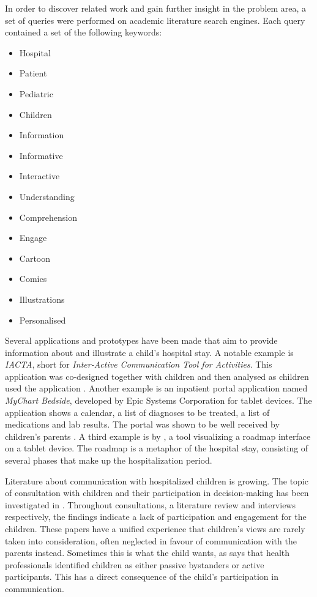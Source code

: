 In order to discover related work and gain further insight in the problem area, a set of queries were performed on academic literature search engines. Each query contained a set of the following keywords:

\begin{multicols}{3}
    \raggedcolumns
    \begin{itemize}
        \item Hospital
        \item Patient
        \item Pediatric
        \item Children
        \item Information
        \item Informative
        \item Interactive
        \item Understanding
        \item Comprehension
        \item Engage
        \item Cartoon
        \item Comics
        \item Illustrations
        \item Personalised
    \end{itemize}
\end{multicols}


Several applications and prototypes have been made that aim to provide information about and illustrate a child's hospital stay. A notable example is \emph{IACTA}, short for \emph{Inter-Active Communication Tool for Activities}. This application was co-designed together with children \autocite{stalberg2016} and then analysed as children used the application \autocite{stalberg2018}. Another example is an inpatient portal application named \emph{MyChart Bedside}, developed by Epic Systems Corporation for tablet devices. The application shows a calendar, a list of diagnoses to be treated, a list of medications and lab results. The portal was shown to be well received by children's parents \autocite{kelly2017}. A third example is by \textcite{maher2016}, a tool visualizing a roadmap interface on a tablet device. The roadmap is a metaphor of the hospital stay, consisting of several phases that make up the hospitalization period.

Literature about communication with hospitalized children is growing. The topic of consultation with children and their participation in decision-making has been investigated in \textcite{coyne2006,coyne2008,coyne2011}. Throughout consultations, a literature review and interviews respectively, the findings indicate a lack of participation and engagement for the children. These papers have a unified experience that children's views are rarely taken into consideration, often neglected in favour of communication with the parents instead. Sometimes this is what the child wants, as \textcite{lambert2011} says that health professionals identified children as either passive bystanders or active participants. This has a direct consequence of the child's participation in communication.


